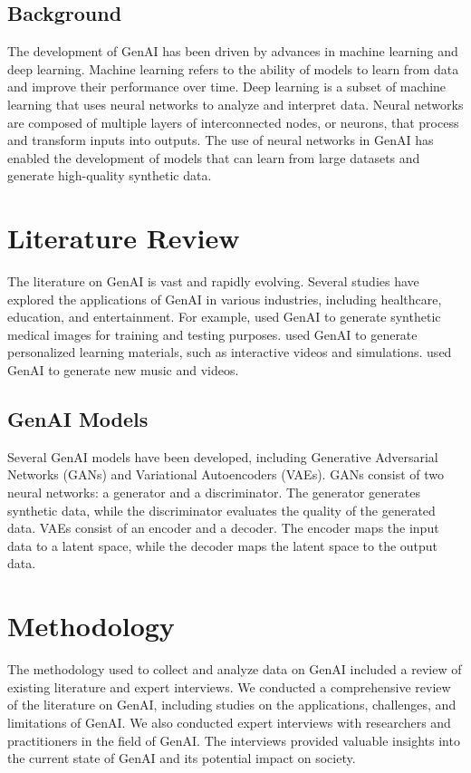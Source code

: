 \documentclass[12pt,a4paper]{article}
\begin{document}
\subsection{Background}
The development of GenAI has been driven by advances in machine learning and deep learning. Machine learning refers to the ability of models to learn from data and improve their performance over time. Deep learning is a subset of machine learning that uses neural networks to analyze and interpret data. Neural networks are composed of multiple layers of interconnected nodes, or neurons, that process and transform inputs into outputs. The use of neural networks in GenAI has enabled the development of models that can learn from large datasets and generate high-quality synthetic data.

\section{Literature Review}
The literature on GenAI is vast and rapidly evolving. Several studies have explored the applications of GenAI in various industries, including healthcare, education, and entertainment. For example, \citet{wang2020} used GenAI to generate synthetic medical images for training and testing purposes. \citet{lee2020} used GenAI to generate personalized learning materials, such as interactive videos and simulations. \citet{kim2020} used GenAI to generate new music and videos.

\subsection{GenAI Models}
Several GenAI models have been developed, including Generative Adversarial Networks (GANs) and Variational Autoencoders (VAEs). GANs consist of two neural networks: a generator and a discriminator. The generator generates synthetic data, while the discriminator evaluates the quality of the generated data. VAEs consist of an encoder and a decoder. The encoder maps the input data to a latent space, while the decoder maps the latent space to the output data.

\section{Methodology}
The methodology used to collect and analyze data on GenAI included a review of existing literature and expert interviews. We conducted a comprehensive review of the literature on GenAI, including studies on the applications, challenges, and limitations of GenAI. We also conducted expert interviews with researchers and practitioners in the field of GenAI. The interviews provided valuable insights into the current state of GenAI and its potential impact on society.
\end{document}
